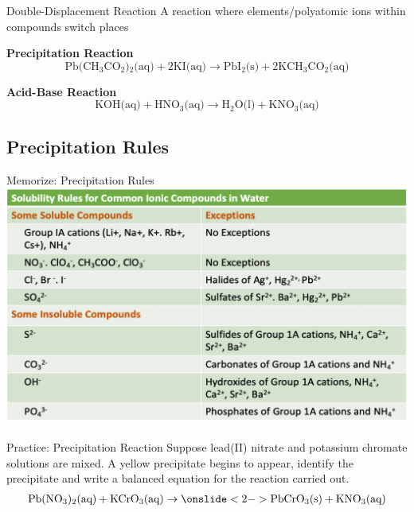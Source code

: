 \documentclass[11pt]{beamer}
\begin{document}
\begin{frame}{Double-Displacement Reaction}
  A reaction where elements/polyatomic ions within compounds switch places

  \textbf{Precipitation Reaction}
  \begin{equation}
    \text{Pb(CH$_3$CO$_2$)$_2$(aq)} + 2\text{KI(aq)} \rightarrow
    \text{PbI$_2$(s)} + 2\text{KCH$_3$CO$_2$(aq)}
  \end{equation}

  \textbf{Acid-Base Reaction}
  \begin{equation}
    \text{KOH(aq)} + \text{HNO$_3$(aq)} \rightarrow \text{H$_2$O(l)} + \text{KNO$_3$(aq)}
  \end{equation}
\end{frame}

\subsection{Precipitation Rules}

\begin{frame}{Memorize: Precipitation Rules}
  \centering
  \includegraphics[scale=0.3]{solubility_rules}
\end{frame}

\begin{frame}{Practice: Precipitation Reaction}
  Suppose lead(II) nitrate and potassium chromate solutions are mixed.
  A yellow precipitate begins to appear, identify the precipitate and
  write a balanced equation for the reaction carried out.
  \begin{align*}
    \text{Pb(NO$_3$)$_2$(aq)} + \text{KCrO$_3$(aq)} \rightarrow
    \onslide<2->{\text{PbCrO$_3$(s)} + \text{KNO$_3$(aq)}}
  \end{align*}
\end{frame}
\end{document}
